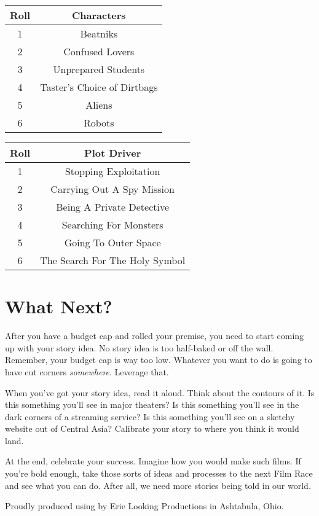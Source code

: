 \documentclass[
notumble,
a5paper
]{leaflet}
\begin{document}
\begin{center}
\begin{tabular}{ |c|c| } 
 \hline
 Roll & Characters \\ 
 \hline
 1 & Beatniks \\
 \hline
 2 & Confused Lovers \\
 \hline
 3 & Unprepared Students \\
 \hline
 4 & Taster's Choice of Dirtbags \\
 \hline
 5 & Aliens \\
 \hline
 6 & Robots \\
 \hline
\end{tabular}
\end{center}

\begin{center}
\begin{tabular}{ |c|c| } 
 \hline
 Roll & Plot Driver \\ 
 \hline
 1 & Stopping Exploitation \\
 \hline
 2 & Carrying Out A Spy Mission \\
 \hline
 3 & Being A Private Detective \\
 \hline
 4 & Searching For Monsters \\
 \hline
 5 & Going To Outer Space \\
 \hline
 6 & The Search For The Holy Symbol \\
 \hline
\end{tabular}
\end{center}

\cleardoublepage

\section*{What Next?}

After you have a budget cap and rolled your premise, you need to start coming up with your story idea.  No story idea is too half-baked or off the wall.  Remember, your budget cap is way too low.  Whatever you want to do is going to have cut corners \emph{somewhere}.  Leverage that.

When you've got your story idea, read it aloud.  Think about the contours of it.  Is this something you'll see in major theaters?  Is this something you'll see in the dark corners of a streaming service?  Is this something you'll see on a sketchy website out of Central Asia?  Calibrate your story to where you think it would land.

At the end, celebrate your success.  Imagine how you would make such films.  If you're bold enough, take those sorts of ideas and processes to the next Film Race and see what you can do.  After all, we need more stories being told in our world.


\clearpage
\clearpage
\doclicenseThis

\begin{center}
Proudly produced using  by Erie Looking Productions in Ashtabula, Ohio.
\end{center}
\end{document}
